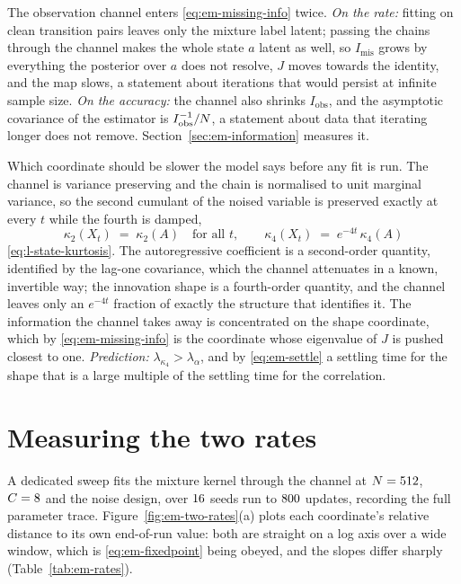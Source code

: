The observation channel enters \eqref{eq:em-missing-info} twice. \emph{On the
rate:} fitting on clean transition pairs leaves only the mixture label
latent; passing the chains through the channel makes the whole state $a$
latent as well, so $I_{\mathrm{mis}}$ grows by everything the posterior over
$a$ does not resolve, $J$ moves towards the identity, and the map slows, a
statement about iterations that would persist at infinite sample size.
\emph{On the accuracy:} the channel also shrinks $I_{\mathrm{obs}}$, and the
asymptotic covariance of the estimator is $I_{\mathrm{obs}}^{-1}/N$, a
statement about data that iterating longer does not remove.
Section~\ref{sec:em-information} measures it.

Which coordinate should be slower the model says before any fit is run. The
channel is variance preserving and the chain is normalised to unit marginal
variance, so the second cumulant of the noised variable is preserved exactly
at every $t$ while the fourth is damped,
\begin{equation}
  \kappa_2(X_t) \;=\; \kappa_2(A) \quad \text{for all } t,
  \qquad
  \kappa_4(X_t) \;=\; e^{-4t}\,\kappa_4(A)
  \label{eq:em-cumulant-damping}
\end{equation}
\eqref{eq:l-state-kurtosis}. The autoregressive coefficient is a second-order
quantity, identified by the lag-one covariance, which the channel attenuates
in a known, invertible way; the innovation shape is a fourth-order quantity,
and the channel leaves only an $e^{-4t}$ fraction of exactly the structure that
identifies it. The information the channel takes away is concentrated on the
shape coordinate, which by \eqref{eq:em-missing-info} is the coordinate whose
eigenvalue of $J$ is pushed closest to one. \emph{Prediction:}
$\lambda_{\kappa_4} > \lambda_{\alpha}$, and by \eqref{eq:em-settle} a
settling time for the shape that is a large multiple of the settling time for
the correlation.

\section{Measuring the two rates}\label{sec:em-two-rates}

A dedicated sweep fits the mixture kernel through the channel at
$N = 512$, $C = 8$ and the \convdesign{} noise design, over
$16$ seeds run to $800$ updates, recording the full parameter
trace. Figure~\ref{fig:em-two-rates}(a) plots each coordinate's relative
distance to its own end-of-run value: both are straight on a log axis over a
wide window, which is \eqref{eq:em-fixedpoint} being obeyed, and the slopes
differ sharply (Table~\ref{tab:em-rates}).

